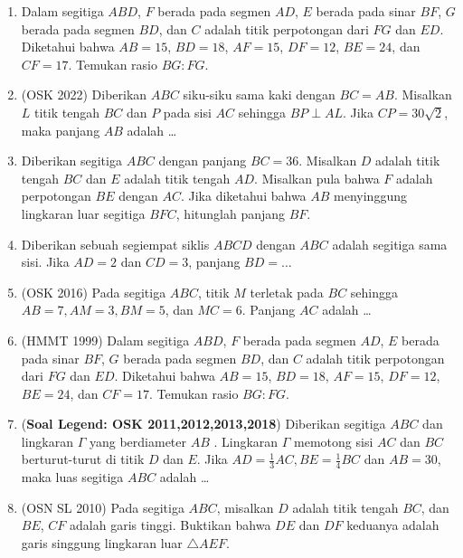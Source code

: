 \documentclass[11pt]{scrartcl}
\begin{document}
\begin{enumerate}
        \item Dalam segitiga $ABD$, $F$ berada pada segmen $AD$, $E$ berada pada sinar $BF$, $G$ berada pada segmen $BD$, dan $C$ adalah titik perpotongan dari $FG$ dan $ED$. Diketahui bahwa $AB = 15$, $BD = 18$, $AF = 15$, $DF = 12$, $BE = 24$, dan $CF = 17$. Temukan rasio $BG : FG$.

    \item (OSK 2022) Diberikan $ABC$ siku-siku sama kaki dengan $BC=AB$. Misalkan $L$ titik tengah $BC$ dan $P$ pada sisi $AC$ sehingga $BP \perp AL$. Jika $CP=30\sqrt{2}$, maka panjang $AB$ adalah \ldots

    \item Diberikan segitiga $ABC$ dengan panjang $BC = 36$. Misalkan $D$ adalah titik tengah $BC$ dan $E$ adalah titik tengah $AD$. Misalkan pula bahwa $F$ adalah perpotongan $BE$ dengan $AC$. Jika diketahui bahwa $AB$ menyinggung lingkaran luar segitiga $BFC$, hitunglah panjang $BF$.

    \item Diberikan sebuah segiempat siklis $ABCD$ dengan $ABC$ adalah segitiga sama sisi. Jika $AD=2$ dan $CD=3$, panjang $BD=\dots$

        \item (OSK 2016) Pada segitiga $ABC$, titik $M$ terletak pada $BC$ sehingga $AB=7, AM=3, BM=5$, dan $MC=6$. Panjang $AC$ adalah \dots

    \item (HMMT 1999) Dalam segitiga $ABD$, $F$ berada pada segmen $AD$, $E$ berada pada sinar $BF$, $G$ berada pada segmen $BD$, dan $C$ adalah titik perpotongan dari $FG$ dan $ED$. Diketahui bahwa $AB = 15$, $BD = 18$, $AF = 15$, $DF = 12$, $BE = 24$, dan $CF = 17$. Temukan rasio $BG : FG$.

        \item (\textbf{Soal Legend: OSK 2011,2012,2013,2018}) Diberikan segitiga $ABC$ dan lingkaran $\Gamma$ yang berdiameter $AB$ . Lingkaran $\Gamma$ memotong sisi $AC$ dan $BC$ berturut-turut di titik $D$ dan $E$. Jika $AD = \frac13 AC, BE =\frac14 BC$ dan $AB = 30$, maka luas segitiga $ABC$ adalah \dots

    \item (OSN SL 2010) Pada segitiga $ABC$, misalkan $D$ adalah titik tengah $BC$, dan $BE$, $CF$ adalah garis tinggi. Buktikan bahwa $DE$ dan $DF$ keduanya adalah garis singgung lingkaran luar $\triangle AEF$. %


\end{enumerate}
\end{document}
